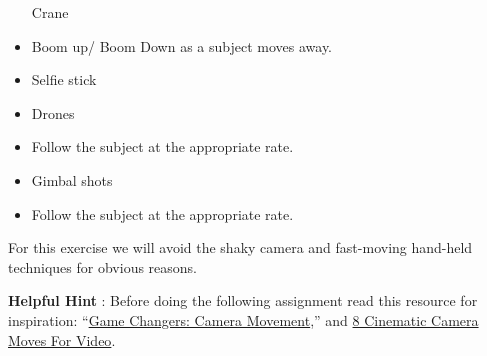 \documentclass[
]{book}
\begin{document}
\begin{assessment}
\begin{itemize}
  Crane\\
\item
  Boom up/ Boom Down as a subject moves away.\\
\item
  Selfie stick\\
\item
  Drones\\
\item
  Follow the subject at the appropriate rate.\\
\item
  Gimbal shots\\
\item
  Follow the subject at the appropriate rate.
\end{itemize}

For this exercise we will avoid the shaky camera and fast-moving hand-held techniques for obvious reasons.
\end{assessment}

\begin{caution}
\textbf{Helpful Hint} : Before doing the following assignment read this resource for inspiration: ``\href{https://www.filmcomment.com/article/game-changers-camera-movement/}{Game Changers: Camera Movement},'' and \href{https://www.youtube.com/watch?v=6_p93J3OwfU}{8 Cinematic Camera Moves For Video}.
\end{caution}
\end{document}
